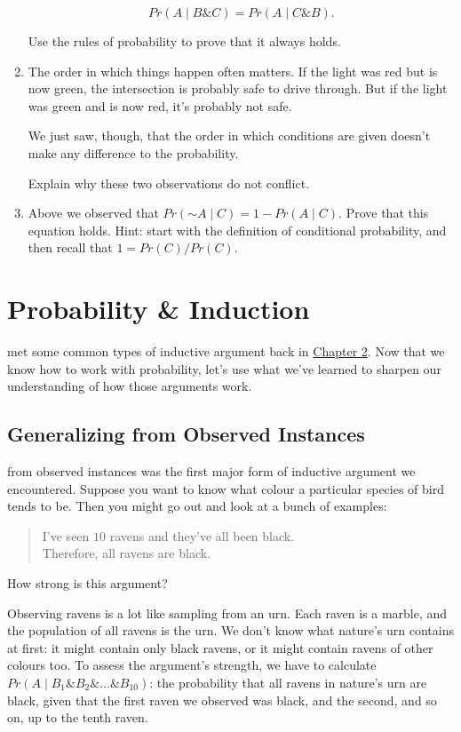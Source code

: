 \documentclass[justified]{tufte-book}
\newcommand{\given}{\mid}
\renewcommand{\neg}{\mathbin{\sim}}
\renewcommand{\wedge}{\mathbin{\&}}
\newcommand{\p}{Pr}
\newenvironment{argument}{\begin{quote}\normalsize}{\end{quote}}
\theoremstyle{definition}
\theoremstyle{definition}
\theoremstyle{definition}
\theoremstyle{remark}
\begin{document}
\begin{enumerate}
  \[ \p(A \given B \wedge C) = \p(A \given C \wedge B).\]

  Use the rules of probability to prove that it always holds.
\item
  The order in which things happen often matters. If the light was red but is now green, the intersection is probably safe to drive through. But if the light was green and is now red, it's probably not safe.

  We just saw, though, that the order in which conditions are given doesn't make any difference to the probability.

  Explain why these two observations do not conflict.
\item
  Above we observed that \(\p(\neg A \given C) = 1 - \p(A \given C)\). Prove that this equation holds. Hint: start with the definition of conditional probability, and then recall that \(1 = \p(C) / \p(C)\).
\end{enumerate}

\hypertarget{probability-induction}{%
\chapter{Probability \& Induction}\label{probability-induction}}

 met some common types of inductive argument back in \protect\hyperlink{indargs}{Chapter 2}. Now that we know how to work with probability, let's use what we've learned to sharpen our understanding of how those arguments work.

\hypertarget{generalizing-from-observed-instances}{%
\section{Generalizing from Observed Instances}\label{generalizing-from-observed-instances}}

 from observed instances was the first major form of inductive argument we encountered. Suppose you want to know what colour a particular species of bird tends to be. Then you might go out and look at a bunch of examples:

\begin{argument}
I've seen \(10\) ravens and they've all been black.\\
Therefore, all ravens are black.
\end{argument}

How strong is this argument?

Observing ravens is a lot like sampling from an urn. Each raven is a marble, and the population of all ravens is the urn. We don't know what nature's urn contains at first: it might contain only black ravens, or it might contain ravens of other colours too. To assess the argument's strength, we have to calculate \(\p(A \given B_1 \wedge B_2 \wedge \ldots \wedge B_{10})\): the probability that all ravens in nature's urn are black, given that the first raven we observed was black, and the second, and so on, up to the tenth raven.
\end{document}
